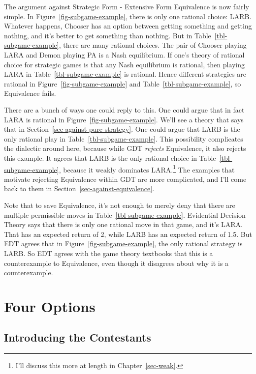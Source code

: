 \documentclass[
  12pt,
  letterpaper,
  DIV=11,
  numbers=noendperiod]{scrreprt}
\begin{document}
The argument against Strategic Form - Extensive Form Equivalence is now
fairly simple. In Figure~\ref{fig-subgame-example}, there is only one
rational choice: LARB. Whatever happens, Chooser has an option between
getting something and getting nothing, and it's better to get something
than nothing. But in Table~\ref{tbl-subgame-example}, there are many
rational choices. The pair of Chooser playing LARA and Demon playing PA
is a Nash equilibrium. If one's theory of rational choice for strategic
games is that any Nash equilibrium is rational, then playing LARA in
Table~\ref{tbl-subgame-example} is rational. Hence different strategies
are rational in Figure~\ref{fig-subgame-example} and
Table~\ref{tbl-subgame-example}, so Equivalence fails.

There are a bunch of ways one could reply to this. One could argue that
in fact LARA is rational in Figure~\ref{fig-subgame-example}. We'll see
a theory that says that in Section~\ref{sec-against-pure-strategy}. One
could argue that LARB is the only rational play in
Table~\ref{tbl-subgame-example}. This possibility complicates the
dialectic around here, because while GDT \emph{rejects} Equivalence, it
also rejects this example. It agrees that LARB is the only rational
choice in Table~\ref{tbl-subgame-example}, because it weakly dominates
LARA.\footnote{I'll discuss this more at length in
  Chapter~\ref{sec-weak}.} The examples that motivate rejecting
Equivalence within GDT are more complicated, and I'll come back to them
in Section~\ref{sec-against-equivalence}.

Note that to save Equivalence, it's not enough to merely deny that there
are multiple permissible moves in Table~\ref{tbl-subgame-example}.
Evidential Decision Theory says that there is only one rational move in
that game, and it's LARA. That has an expected return of 2, while LARB
has an expected return of 1.5. But EDT agrees that in
Figure~\ref{fig-subgame-example}, the only rational strategy is LARB. So
EDT agrees with the game theory textbooks that this is a counterexample
to Equivalence, even though it disagrees about why it is a
counterexample.

\section{Four Options}\label{sec-four-options}

\subsection{Introducing the Contestants}\label{sec-contestants}
\end{document}
